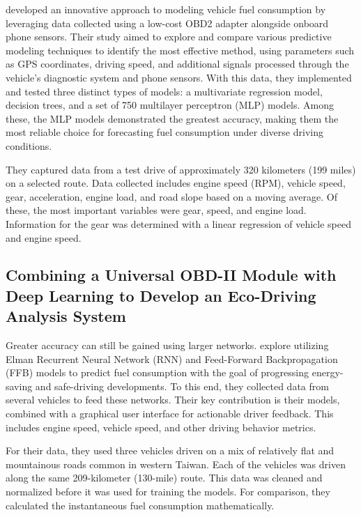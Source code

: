 \documentclass[letterpaper]{article}
\begin{document}
\cite{rykala2023modeling} developed an innovative approach to modeling vehicle fuel
consumption by leveraging data collected using a low-cost OBD2 adapter alongside
onboard phone sensors. Their study aimed to explore and compare various
predictive modeling techniques to identify the most effective method, using
parameters such as GPS coordinates, driving speed, and additional signals
processed through the vehicle's diagnostic system and phone sensors. With this
data, they implemented and tested three distinct types of models: a multivariate
regression model, decision trees, and a set of 750 multilayer perceptron (MLP)
models. Among these, the MLP models demonstrated the greatest accuracy, making
them the most reliable choice for forecasting fuel consumption under diverse
driving conditions. 

They captured data from a test drive of approximately 320
kilometers (199 miles) on a selected route. Data collected includes engine speed
(RPM), vehicle speed, gear, acceleration, engine load, and road slope based on a
moving average. Of these, the most important variables were gear, speed, and
engine load. Information for the gear was determined with a linear regression of
vehicle speed and engine speed.

\subsection*{Combining a Universal OBD-II Module with Deep Learning to Develop
an Eco-Driving Analysis System}

Greater accuracy can still be gained using larger networks. \cite{yen_combining_2021} 
explore utilizing Elman Recurrent Neural Network (RNN) and Feed-Forward Backpropagation
(FFB) models to predict fuel consumption with the goal of progressing
energy-saving and safe-driving developments. To this end, they collected data
from several vehicles to feed these networks. Their key contribution is their
models, combined with a graphical user interface for actionable driver feedback.
This includes engine speed, vehicle speed, and other driving behavior metrics.

For their data, they used three vehicles driven on a mix of relatively flat and
mountainous roads common in western Taiwan. Each of the vehicles was driven
along the same 209-kilometer (130-mile) route. This data was cleaned and
normalized before it was used for training the models. For comparison, they
calculated the instantaneous fuel consumption mathematically.
\end{document}
